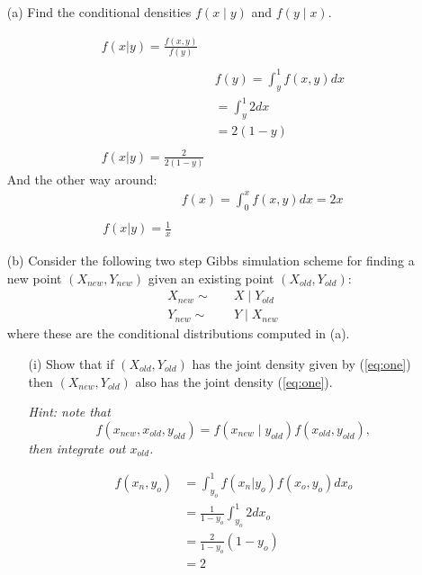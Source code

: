 \documentclass{article}
\newcommand{\1}{\mathbf{1}}
\begin{document}
\begin{enumerate}
    \item[(a)] Find the conditional densities $f(x\mid y)$ and $f(y \mid x)$.
    
    \begin{align*}
        f(x|y) = \frac{f(x,y)}{f(y)}& \\
        \\
        &f(y) = \int_y^1 f(x,y) dx \\
        &= \int_y^1 2dx \\
        &= 2(1-y) \\
        \\
        f(x|y) = \frac{2}{2(1-y)}&
    \end{align*}
    And the other way around:
    \begin{align*}
        &f(x) = \int_0^x f(x,y) dx = 2x \\
        \\
        f(x|y) = \frac{1}{x}&
    \end{align*}
    
    \newpage
    \item [(b)] Consider the following two step Gibbs simulation scheme for finding a new point $(X_{new}, Y_{new})$ given an existing point $(X_{old}, Y_{old})$:
    \begin{align*}
        X_{new} \sim&\quad X \mid Y_{old}\\
        Y_{new} \sim&\quad Y \mid X_{new}
    \end{align*}
    where these are the conditional distributions computed in (a).
    \begin{enumerate}
        \item[(i)] Show that if $(X_{old},Y_{old})$ has the joint density given by (\ref{eq:one}) then $(X_{new},Y_{old})$ also has the joint density  (\ref{eq:one}).\par
        {\it Hint: note that 
        $$f(x_{new},x_{old},y_{old}) = f(x_{new}\mid y_{old})f(x_{old},y_{old}),$$
        then integrate out $x_{old}$.}
        
        \begin{align*}
            f(x_n, y_o) &= \int_{y_o}^1 f(x_n|y_o)f(x_o,y_o)dx_o \\
            &= \frac{1}{1-y_o} \int_{y_o}^1 2 dx_o \\
            &= \frac{2}{1-y_o}(1-y_o) \\
            &=2
        \end{align*}


\end{enumerate}
\end{enumerate}
\end{document}
